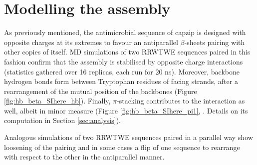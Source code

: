 \section{Modelling the assembly} \label{sec:build}

As previously mentioned, the antimicrobial sequence of capzip is designed with opposite charges at its extremes to favour an antiparallel $\beta$-sheets pairing with other copies of itself.
%
MD simulations of two RRWTWE sequences paired in this fashion confirm that the assembly is stabilised by opposite charge interactions (statistics gathered over 16 replicas, each run for 20 ns).
%
Moreover, backbone hydrogen bonds form between Tryptophan residues of facing strands, after a rearrangement of the mutual position of the backbones (Figure \ref{fig:hb_beta_SIhere_hb}).
%
Finally, $\pi$-stacking contributes to the interaction as well, albeit in minor measure (Figure \ref{fig:hb_beta_SIhere_pi1}, . Details on its computation in Section \ref{sec:analysis}).

Analogous simulations of two RRWTWE sequences paired in a parallel way show loosening of the pairing and in some cases a flip of one sequence to rearrange with respect to the other in the antiparallel manner.

